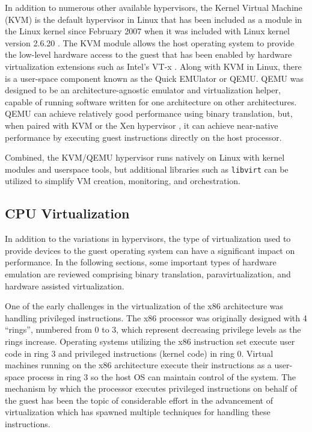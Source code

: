 In addition to numerous other available hypervisors, the Kernel Virtual Machine (KVM) is the default hypervisor in Linux that has been included as a module in the Linux kernel since February 2007 when it was included with Linux kernel version 2.6.20 \autocite{_kvm_1}.
The KVM module allows the host operating system to provide the low-level hardware access to the guest that has been enabled by hardware virtualization extensions such as Intel's VT-x \autocite{_grinberg_1}.
Along with KVM in Linux, there is a user-space component known as the Quick EMUlator or QEMU\autocite{_qemu_1}.
QEMU was designed to be an architecture-agnostic emulator and virtualization helper, capable of running software written for one architecture on other architectures.
QEMU can achieve relatively good performance using binary translation, but, when paired with KVM or the Xen hypervisor \autocite{_barham_1}, it can achieve near-native performance by executing guest instructions directly on the host processor.

Combined, the KVM/QEMU hypervisor runs natively on Linux with kernel modules and userspace tools, but additional libraries such as \texttt{libvirt} \autocite{_libvirt_1} can be utilized to simplify VM creation, monitoring, and orchestration.


\subsection{CPU Virtualization}
\label{sec:vtcpu}
In addition to the variations in hypervisors, the type of virtualization used to provide devices to the guest operating system can have a significant impact on performance.
In the following sections, some important types of hardware emulation are reviewed comprising binary translation, paravirtualization, and hardware assisted virtualization.

One of the early challenges in the virtualization of the x86 architecture was handling privileged instructions.
The x86 processor was originally designed with 4 ``rings'', numbered from 0 to 3, which represent decreasing privilege levels as the rings increase.
Operating systems utilizing the x86 instruction set execute user code in ring 3 and privileged instructions (kernel code) in ring 0.
Virtual machines running on the x86 architecture execute their instructions as a user-space process in ring 3 so the host OS can maintain control of the system.
The mechanism by which the processor executes privileged instructions on behalf of the guest has been the topic of considerable effort in the advancement of virtualization which has spawned multiple techniques for handling these instructions.

